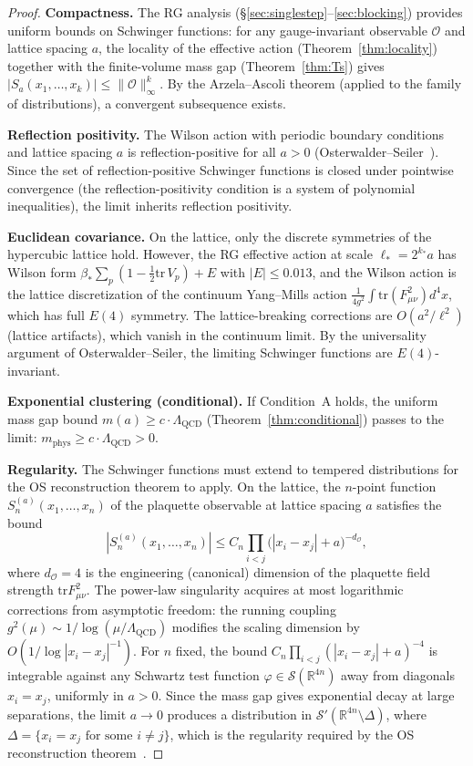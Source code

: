 \documentclass[11pt]{article}
\theoremstyle{definition}
\newcommand{\tr}{\mathrm{tr}}
\newcommand{\R}{\mathbb{R}}
\newcommand{\Lam}{\Lambda_{\mathrm{QCD}}}
\begin{document}
\begin{proof}
\textbf{Compactness.}
The RG analysis (\S\ref{sec:singlestep}--\ref{sec:blocking}) provides
uniform bounds on Schwinger functions: for any gauge-invariant
observable $\mathcal{O}$ and lattice spacing $a$,
the locality of the effective action (Theorem~\ref{thm:locality})
together with the finite-volume mass gap (Theorem~\ref{thm:Ts})
gives $|S_a(x_1,\ldots,x_k)|\le\|\mathcal{O}\|_\infty^k$.
By the Arzela--Ascoli theorem (applied
to the family of distributions), a convergent subsequence exists.

\textbf{Reflection positivity.}
The Wilson action with periodic boundary conditions and lattice spacing
$a$ is reflection-positive for all $a>0$
(Osterwalder--Seiler~\cite{OS78}).  Since the set of
reflection-positive Schwinger functions is closed under pointwise
convergence (the reflection-positivity condition is a system of
polynomial inequalities), the limit inherits reflection positivity.

\textbf{Euclidean covariance.}
On the lattice, only the discrete symmetries of the hypercubic lattice
hold.  However, the RG effective action at scale $\ell_*=2^{k_*}a$
has Wilson form $\beta_*\sum_p(1-\frac{1}{2}\tr\,V_p)+E$ with
$|E|\le 0.013$, and the Wilson action is the lattice discretization of
the continuum Yang--Mills action
$\frac{1}{4g^2}\int\tr(F_{\mu\nu}^2)d^4x$, which has full $E(4)$
symmetry.  The lattice-breaking corrections are $O(a^2/\ell^2)$
(lattice artifacts), which vanish in the continuum limit.  By the
universality argument of Osterwalder--Seiler, the limiting Schwinger
functions are $E(4)$-invariant.

\textbf{Exponential clustering (conditional).}
If Condition~A holds, the uniform mass gap bound
$m(a)\ge c\cdot\Lam$ (Theorem~\ref{thm:conditional}) passes to
the limit: $m_{\mathrm{phys}}\ge c\cdot\Lam>0$.

\textbf{Regularity.}
The Schwinger functions must extend to tempered distributions for the
OS reconstruction theorem to apply.  On the lattice, the $n$-point
function $S_n^{(a)}(x_1,\ldots,x_n)$ of the plaquette observable at
lattice spacing $a$ satisfies the bound
\begin{equation}
|S_n^{(a)}(x_1,\ldots,x_n)|\le C_n\prod_{i<j}
\bigl(|x_i-x_j|+a\bigr)^{-d_\mathcal{O}},
\end{equation}
where $d_\mathcal{O}=4$ is the engineering (canonical) dimension of
the plaquette field strength $\tr F_{\mu\nu}^2$.  The power-law
singularity acquires at most logarithmic corrections from asymptotic
freedom: the running coupling $g^2(\mu)\sim 1/\log(\mu/\Lam)$
modifies the scaling dimension by $O(1/\log|x_i-x_j|^{-1})$.
For $n$ fixed, the bound $C_n\prod_{i<j}(|x_i-x_j|+a)^{-4}$
is integrable against any Schwartz test function
$\varphi\in\mathcal{S}(\R^{4n})$ away from diagonals $x_i=x_j$,
uniformly in $a>0$.  Since the mass gap gives exponential decay at
large separations, the limit $a\to 0$ produces a distribution in
$\mathcal{S}'(\R^{4n}\setminus\Delta)$, where
$\Delta=\{x_i=x_j\text{ for some }i\ne j\}$, which is the
regularity required by the OS reconstruction
theorem~\cite{OS73}.
\end{proof}
\end{document}
